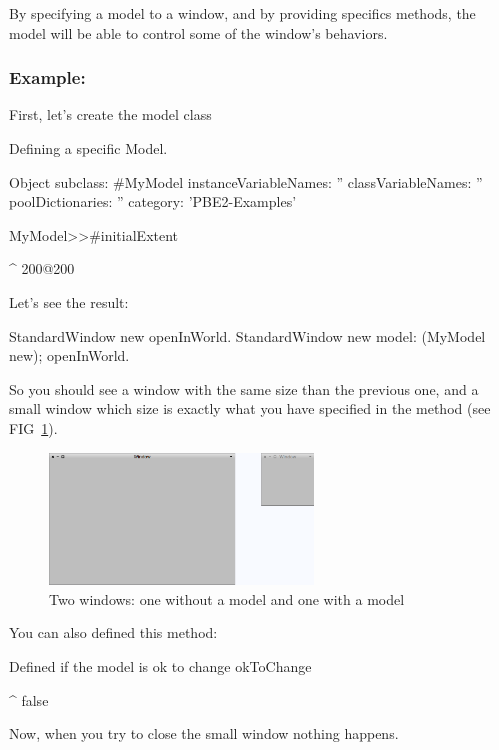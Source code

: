 \documentclass[a4paper,10pt,twoside]{book}
\begin{document}
By specifying a model to a window, and by providing specifics methods, the model will be able to control some of the window's behaviors.

\subsubsection{Example:}

First, let's create the model class

\begin{classdef}{Defining a specific Model.}

Object subclass: #MyModel
	instanceVariableNames: ''
	classVariableNames: ''
	poolDictionaries: ''
	category: 'PBE2-Examples'

MyModel>>#initialExtent

	^ 200@200
\end{classdef}

Let's see the result:

\begin{code}{}
StandardWindow new openInWorld.
StandardWindow new model: (MyModel new); openInWorld.
\end{code}

So you should see a window with the same size than the previous one, and a small window which size is exactly what you have specified in the method  (see FIG~\ref{fig:withAndWithoutModel}).

\begin{figure}[ht]\centering
	\includegraphics[width=7cm]{WithAndWithoutModel}
	\caption{Two windows: one without a model and one with a model}
	\label{fig:withAndWithoutModel}
\end{figure}

You can also defined this method:

\begin{method}{Defined if the model is ok to change}
okToChange

	^ false
\end{method}

Now, when you try to close the small window nothing happens.
\end{document}

